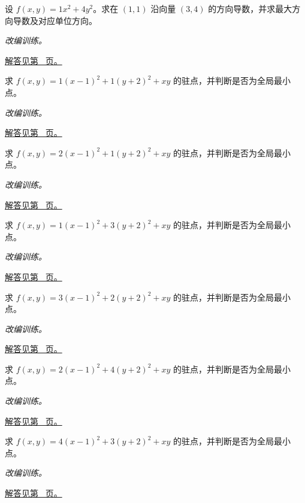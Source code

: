 \documentclass[UTF8,12pt,a4paper,fontset=fandol]{ctexart}
\begin{document}
\begin{example}[梯度与最陡方向]\label{ex:c34q13}
设 $f(x,y)=1x^2+4y^2$。求在 $(1,1)$ 沿向量 $(3,4)$ 的方向导数，并求最大方向导数及对应单位方向。
\par\textit{改编训练。}\par\hyperref[ans:c34q13]{解答见第~\pageref{ans:c34q13} 页。}
\end{example}
\begin{example}[正定二次型的极小值]\label{ex:c34q14}
求 $f(x,y)=1(x-1)^2+1(y+2)^2+xy$ 的驻点，并判断是否为全局最小点。
\par\textit{改编训练。}\par\hyperref[ans:c34q14]{解答见第~\pageref{ans:c34q14} 页。}
\end{example}
\begin{example}[正定二次型的极小值]\label{ex:c34q15}
求 $f(x,y)=2(x-1)^2+1(y+2)^2+xy$ 的驻点，并判断是否为全局最小点。
\par\textit{改编训练。}\par\hyperref[ans:c34q15]{解答见第~\pageref{ans:c34q15} 页。}
\end{example}
\begin{example}[正定二次型的极小值]\label{ex:c34q16}
求 $f(x,y)=1(x-1)^2+3(y+2)^2+xy$ 的驻点，并判断是否为全局最小点。
\par\textit{改编训练。}\par\hyperref[ans:c34q16]{解答见第~\pageref{ans:c34q16} 页。}
\end{example}
\begin{example}[正定二次型的极小值]\label{ex:c34q17}
求 $f(x,y)=3(x-1)^2+2(y+2)^2+xy$ 的驻点，并判断是否为全局最小点。
\par\textit{改编训练。}\par\hyperref[ans:c34q17]{解答见第~\pageref{ans:c34q17} 页。}
\end{example}
\begin{example}[正定二次型的极小值]\label{ex:c34q18}
求 $f(x,y)=2(x-1)^2+4(y+2)^2+xy$ 的驻点，并判断是否为全局最小点。
\par\textit{改编训练。}\par\hyperref[ans:c34q18]{解答见第~\pageref{ans:c34q18} 页。}
\end{example}
\begin{example}[正定二次型的极小值]\label{ex:c34q19}
求 $f(x,y)=4(x-1)^2+3(y+2)^2+xy$ 的驻点，并判断是否为全局最小点。
\par\textit{改编训练。}\par\hyperref[ans:c34q19]{解答见第~\pageref{ans:c34q19} 页。}
\end{example}
\end{document}
